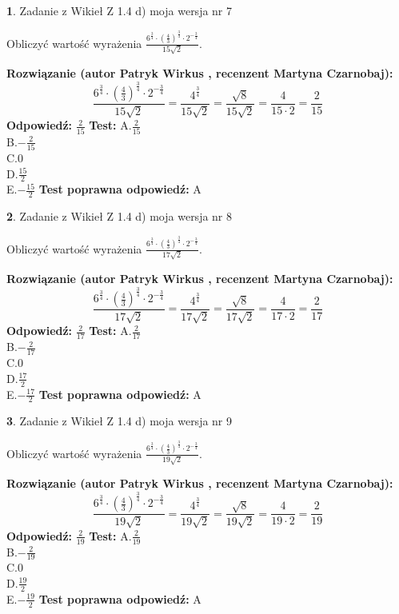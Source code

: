 \documentclass[12pt, a4paper]{article}
\theoremstyle{definition} %
\newtheorem{zad}{}
\newcommand{\zadStart}[1]{\begin{zad}#1\newline}
\newcommand{\zadStop}{\end{zad}}
\newcommand{\rozwStart}[2]{\noindent \textbf{Rozwiązanie (autor #1 , recenzent #2): }\newline}
\newcommand{\rozwStop}{\newline}
\newcommand{\odpStart}{\noindent \textbf{Odpowiedź:}\newline}
\newcommand{\odpStop}{\newline}
\newcommand{\testStart}{\noindent \textbf{Test:}\newline}
\newcommand{\testStop}{\newline}
\newcommand{\kluczStart}{\noindent \textbf{Test poprawna odpowiedź:}\newline}
\newcommand{\kluczStop}{\newline}
\begin{document}
\zadStart{Zadanie z Wikieł Z 1.4 d) moja wersja nr 7}

Obliczyć wartość wyrażenia $\frac{6^{\frac{3}{4}}\cdot (\frac{4}{3})^{\frac{3}{4}}\cdot 2^{-\frac{3}{4}}}{15\sqrt{2}}$.
\zadStop
\rozwStart{Patryk Wirkus}{Martyna Czarnobaj}
$$\frac{6^{\frac{3}{4}}\cdot (\frac{4}{3})^{\frac{3}{4}}\cdot 2^{-\frac{3}{4}}}{15\sqrt{2}} = \frac{4^{\frac{3}{4}}}{15\sqrt{2}} = \frac{\sqrt{8}}{15\sqrt{2}} = \frac{4}{15\cdot 2} = \frac{2}{15}$$
\rozwStop
\odpStart
$\frac{2}{15}$
\odpStop
\testStart
A.$\frac{2}{15}$\\ B.$-\frac{2}{15}$\\ C.$0$\\ D.$\frac{15}{2}$\\ E.$-\frac{15}{2}$
\testStop
\kluczStart
A
\kluczStop



\zadStart{Zadanie z Wikieł Z 1.4 d) moja wersja nr 8}

Obliczyć wartość wyrażenia $\frac{6^{\frac{3}{4}}\cdot (\frac{4}{3})^{\frac{3}{4}}\cdot 2^{-\frac{3}{4}}}{17\sqrt{2}}$.
\zadStop
\rozwStart{Patryk Wirkus}{Martyna Czarnobaj}
$$\frac{6^{\frac{3}{4}}\cdot (\frac{4}{3})^{\frac{3}{4}}\cdot 2^{-\frac{3}{4}}}{17\sqrt{2}} = \frac{4^{\frac{3}{4}}}{17\sqrt{2}} = \frac{\sqrt{8}}{17\sqrt{2}} = \frac{4}{17\cdot 2} = \frac{2}{17}$$
\rozwStop
\odpStart
$\frac{2}{17}$
\odpStop
\testStart
A.$\frac{2}{17}$\\ B.$-\frac{2}{17}$\\ C.$0$\\ D.$\frac{17}{2}$\\ E.$-\frac{17}{2}$
\testStop
\kluczStart
A
\kluczStop



\zadStart{Zadanie z Wikieł Z 1.4 d) moja wersja nr 9}

Obliczyć wartość wyrażenia $\frac{6^{\frac{3}{4}}\cdot (\frac{4}{3})^{\frac{3}{4}}\cdot 2^{-\frac{3}{4}}}{19\sqrt{2}}$.
\zadStop
\rozwStart{Patryk Wirkus}{Martyna Czarnobaj}
$$\frac{6^{\frac{3}{4}}\cdot (\frac{4}{3})^{\frac{3}{4}}\cdot 2^{-\frac{3}{4}}}{19\sqrt{2}} = \frac{4^{\frac{3}{4}}}{19\sqrt{2}} = \frac{\sqrt{8}}{19\sqrt{2}} = \frac{4}{19\cdot 2} = \frac{2}{19}$$
\rozwStop
\odpStart
$\frac{2}{19}$
\odpStop
\testStart
A.$\frac{2}{19}$\\ B.$-\frac{2}{19}$\\ C.$0$\\ D.$\frac{19}{2}$\\ E.$-\frac{19}{2}$
\testStop
\kluczStart
A
\kluczStop
\end{document}
